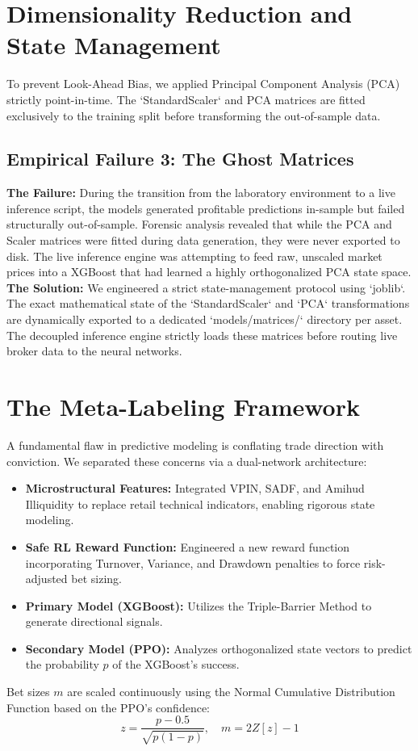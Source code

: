 \documentclass[12pt, a4paper]{article}
\begin{document}
\section{Dimensionality Reduction and State Management}
To prevent Look-Ahead Bias, we applied Principal Component Analysis (PCA) strictly point-in-time. The `StandardScaler` and PCA matrices are fitted exclusively to the training split before transforming the out-of-sample data.

\subsection{Empirical Failure 3: The Ghost Matrices}
\textbf{The Failure:} During the transition from the laboratory environment to a live inference script, the models generated profitable predictions in-sample but failed structurally out-of-sample. Forensic analysis revealed that while the PCA and Scaler matrices were fitted during data generation, they were never exported to disk. The live inference engine was attempting to feed raw, unscaled market prices into a XGBoost that had learned a highly orthogonalized PCA state space.\\
\textbf{The Solution:} We engineered a strict state-management protocol using `joblib`. The exact mathematical state of the `StandardScaler` and `PCA` transformations are dynamically exported to a dedicated `models/matrices/` directory per asset. The decoupled inference engine strictly loads these matrices before routing live broker data to the neural networks.

\section{The Meta-Labeling Framework}
A fundamental flaw in predictive modeling is conflating trade direction with conviction. We separated these concerns via a dual-network architecture:
\begin{itemize}
    \item \textbf{Microstructural Features:} Integrated VPIN, SADF, and Amihud Illiquidity to replace retail technical indicators, enabling rigorous state modeling.
    \item \textbf{Safe RL Reward Function:} Engineered a new reward function incorporating Turnover, Variance, and Drawdown penalties to force risk-adjusted bet sizing.
    \item \textbf{Primary Model (XGBoost):} Utilizes the Triple-Barrier Method to generate directional signals.
    \item \textbf{Secondary Model (PPO):} Analyzes orthogonalized state vectors to predict the probability $p$ of the XGBoost's success.
\end{itemize}
Bet sizes $m$ are scaled continuously using the Normal Cumulative Distribution Function based on the PPO's confidence:
$$ z = \frac{p - 0.5}{\sqrt{p(1-p)}}, \quad m = 2Z[z] - 1 $$
\end{document}
